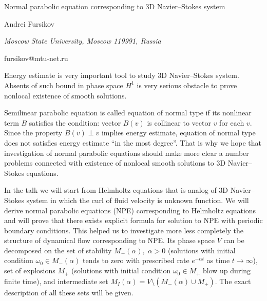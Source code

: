 \documentclass[10pt,a4paper]{article}
\begin{document}
\begin{center}

{\Large Normal parabolic equation corresponding to 3D Navier--Stokes system}

\bigskip

{\sc Andrei Fursikov}

{\small\it Moscow State University, Moscow 119991, Russia}

{\small\rm fursikov@mtu-net.ru}

\end{center}

\bigskip

Energy estimate is very important tool to study 3D Navier--Stokes system.
Absents of such bound in phase space $H^1$ is very serious obstacle to prove 
nonlocal existence of smooth solutions.  

Semilinear parabolic equation is called equation of normal type if its nonlinear term $B$
satisfies the condition: vector $B(v)$ is collinear to vector $v$ for each $v$. Since the property
$B(v)\perp v$ implies energy estimate, equation of normal type does not satisfies energy estimate 
"`in the most degree"'. That is why we hope that investigation of normal parabolic equations should make
more clear a number problems connected with existence of nonlocal smooth solutions to 3D Navier--Stokes equations.

In the talk we will start from Helmholtz equations that is analog of 3D Navier--Stokes system in which the curl
of fluid velocity is unknown function. We will derive normal parabolic equations (NPE) corresponding to Helmholtz equations and will prove that there exists explicit formula for solution to NPE with periodic boundary conditions.
This helped us to investigate more less completely the structure of dynamical flow corresponding to NPE.
Its phase space $V$ can be decomposed on the set of stability $M_-(\alpha ),\; \alpha >0$ (solutions with initial condition $\omega_0 \in M_-(\alpha )$ tends to zero with prescribed rate $e^{-\alpha t}$ as time $t\to \infty $), set of explosions $M_+$ (solutions with initial condition $\omega_0 \in M_+$ blow up during finite time),
and intermediate set $M_I(\alpha )=V\setminus (M_-(\alpha)\cup M_+)$. The exact description of all these sets
will be given.  
\end{document}
